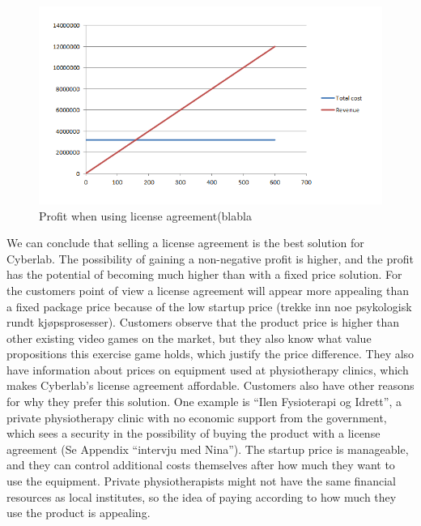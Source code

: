 \begin{figure}
\label{fig:RevenueStreamLicense}
\begin{center}
\includegraphics[scale=0.7]{revenuestreamlicense}
\caption[License example]{Profit when using license agreement(blabla}
\end{center}
\end{figure}
We can conclude that selling a license agreement is the best solution for Cyberlab. The possibility of gaining a non-negative profit is higher, and the profit has the potential of becoming much higher than with a fixed price solution. For the customers point of view a license agreement will appear more appealing than a fixed package price because of the low startup price (trekke inn noe psykologisk rundt kj{ø}psprosesser). Customers observe that the product price is higher than other existing video games on the market, but they also know what value propositions this exercise game holds, which justify the price difference. They also have information about prices on equipment used at physiotherapy clinics, which makes Cyberlab’s license agreement affordable. Customers also have other reasons for why they prefer this solution. One example is “Ilen Fysioterapi og Idrett”, a private physiotherapy clinic with no economic support from the government, which sees a security in the possibility of buying the product with a license agreement (Se Appendix “intervju med Nina”). The startup price is manageable, and they can control additional costs themselves after how much they want to use the equipment. Private physiotherapists might not have the same financial resources as local institutes, so the idea of paying according to how much they use the product is appealing. 

